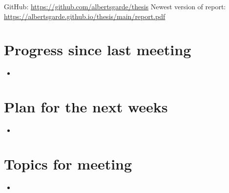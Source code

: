 \documentclass[main.tex]{subfiles}
\begin{document}
GitHub: \url{https://github.com/albertsgarde/thesis}
Newest version of report: \url{https://albertsgarde.github.io/thesis/main/report.pdf}


\section*{Progress since last meeting}
\begin{itemize}
    \item 
\end{itemize}
\section*{Plan for the next weeks}
\begin{itemize}
    \item 
\end{itemize}
\section*{Topics for meeting}
\begin{itemize}
    \item 
\end{itemize}
\end{document}
